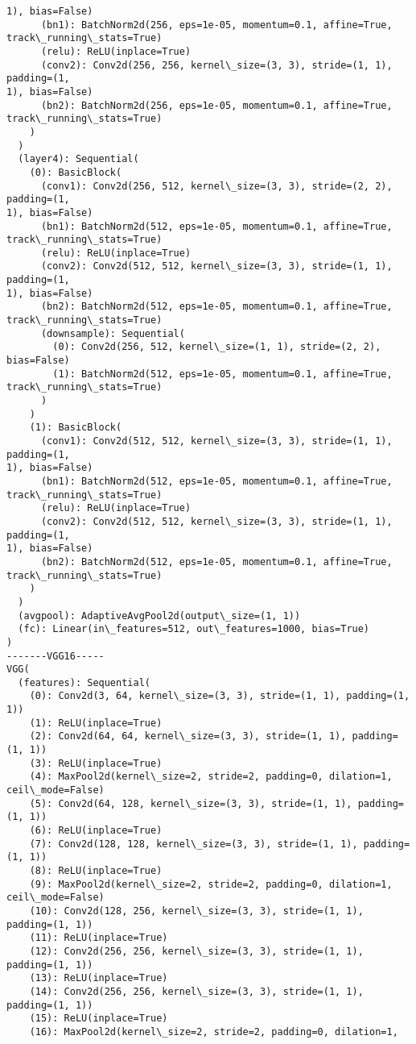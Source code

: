 \documentclass[11pt]{article}
\begin{document}
\begin{Verbatim}[commandchars=\\\{\}]
1), bias=False)
      (bn1): BatchNorm2d(256, eps=1e-05, momentum=0.1, affine=True,
track\_running\_stats=True)
      (relu): ReLU(inplace=True)
      (conv2): Conv2d(256, 256, kernel\_size=(3, 3), stride=(1, 1), padding=(1,
1), bias=False)
      (bn2): BatchNorm2d(256, eps=1e-05, momentum=0.1, affine=True,
track\_running\_stats=True)
    )
  )
  (layer4): Sequential(
    (0): BasicBlock(
      (conv1): Conv2d(256, 512, kernel\_size=(3, 3), stride=(2, 2), padding=(1,
1), bias=False)
      (bn1): BatchNorm2d(512, eps=1e-05, momentum=0.1, affine=True,
track\_running\_stats=True)
      (relu): ReLU(inplace=True)
      (conv2): Conv2d(512, 512, kernel\_size=(3, 3), stride=(1, 1), padding=(1,
1), bias=False)
      (bn2): BatchNorm2d(512, eps=1e-05, momentum=0.1, affine=True,
track\_running\_stats=True)
      (downsample): Sequential(
        (0): Conv2d(256, 512, kernel\_size=(1, 1), stride=(2, 2), bias=False)
        (1): BatchNorm2d(512, eps=1e-05, momentum=0.1, affine=True,
track\_running\_stats=True)
      )
    )
    (1): BasicBlock(
      (conv1): Conv2d(512, 512, kernel\_size=(3, 3), stride=(1, 1), padding=(1,
1), bias=False)
      (bn1): BatchNorm2d(512, eps=1e-05, momentum=0.1, affine=True,
track\_running\_stats=True)
      (relu): ReLU(inplace=True)
      (conv2): Conv2d(512, 512, kernel\_size=(3, 3), stride=(1, 1), padding=(1,
1), bias=False)
      (bn2): BatchNorm2d(512, eps=1e-05, momentum=0.1, affine=True,
track\_running\_stats=True)
    )
  )
  (avgpool): AdaptiveAvgPool2d(output\_size=(1, 1))
  (fc): Linear(in\_features=512, out\_features=1000, bias=True)
)
-------VGG16-----
VGG(
  (features): Sequential(
    (0): Conv2d(3, 64, kernel\_size=(3, 3), stride=(1, 1), padding=(1, 1))
    (1): ReLU(inplace=True)
    (2): Conv2d(64, 64, kernel\_size=(3, 3), stride=(1, 1), padding=(1, 1))
    (3): ReLU(inplace=True)
    (4): MaxPool2d(kernel\_size=2, stride=2, padding=0, dilation=1,
ceil\_mode=False)
    (5): Conv2d(64, 128, kernel\_size=(3, 3), stride=(1, 1), padding=(1, 1))
    (6): ReLU(inplace=True)
    (7): Conv2d(128, 128, kernel\_size=(3, 3), stride=(1, 1), padding=(1, 1))
    (8): ReLU(inplace=True)
    (9): MaxPool2d(kernel\_size=2, stride=2, padding=0, dilation=1,
ceil\_mode=False)
    (10): Conv2d(128, 256, kernel\_size=(3, 3), stride=(1, 1), padding=(1, 1))
    (11): ReLU(inplace=True)
    (12): Conv2d(256, 256, kernel\_size=(3, 3), stride=(1, 1), padding=(1, 1))
    (13): ReLU(inplace=True)
    (14): Conv2d(256, 256, kernel\_size=(3, 3), stride=(1, 1), padding=(1, 1))
    (15): ReLU(inplace=True)
    (16): MaxPool2d(kernel\_size=2, stride=2, padding=0, dilation=1,

\end{Verbatim}
\end{document}
